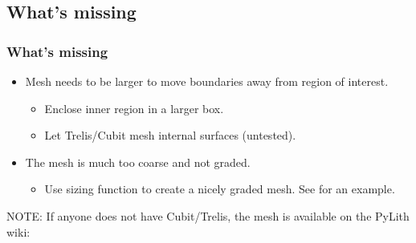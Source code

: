\documentclass[aspectratio=169]{beamer}
\begin{document}
\subsection{What's missing}

\begin{frame}
  \frametitle{What's missing}
  
  \begin{itemize}
  \item Mesh needs to be larger to move boundaries away from region of
    interest.
    \begin{itemize}
    \item Enclose inner region in a larger box.
    \item Let Trelis/Cubit mesh internal surfaces (untested).
    \end{itemize}
  \item The mesh is much too coarse and not graded.
    \begin{itemize}
    \item Use sizing function to create a nicely graded mesh. See
       for an example.
    \end{itemize}
  \end{itemize}

\vfill
NOTE:  If anyone does not have Cubit/Trelis, the mesh is available on the
PyLith wiki:
 
\end{frame}



\end{document}
